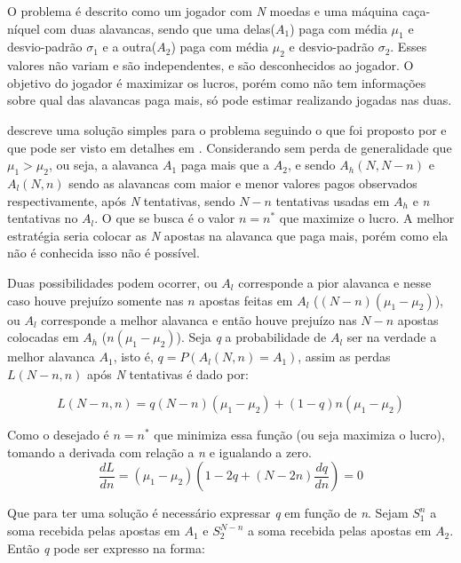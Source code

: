 O problema é descrito como um jogador com \textit{N} moedas e uma máquina caça-níquel com duas alavancas, sendo que uma delas(\(A_1\)) paga com média \(\mu_1\) e desvio-padrão \(\sigma_1\) e a outra(\(A_2\)) paga com média \(\mu_2\) e desvio-padrão \(\sigma_2\). Esses valores não variam e são independentes, e são desconhecidos ao jogador. O objetivo do jogador é maximizar os lucros, porém como não tem informações sobre qual das alavancas paga mais, só pode estimar realizando jogadas nas duas. 

\citeauthor{Mitchell1996} descreve uma solução simples para o problema seguindo o que foi proposto por \citeauthor{Holland1992} e que pode ser visto em detalhes em . Considerando sem perda de generalidade que \(\mu_1 > \mu_2\), ou seja, a alavanca \(A_1\) paga mais que a \(A_2\), e sendo \(A_h(N, N-n)\) e \(A_l(N,n)\) sendo as alavancas com maior e menor valores pagos observados respectivamente, após \textit{N} tentativas, sendo \(N-n\) tentativas usadas em \(A_h\) e \textit{n} tentativas no \(A_l\). O que se busca é o valor \(n = n^*\) que maximize o lucro. A melhor estratégia seria colocar as \textit{N} apostas na alavanca que paga mais, porém como ela não é conhecida isso não é possível.

Duas possibilidades podem ocorrer, ou \(A_l\) corresponde a pior alavanca e nesse caso houve prejuízo somente nas \(n\) apostas feitas em \(A_l\) (\((N-n)(\mu_1-\mu_2)\)), ou \(A_l\) corresponde a melhor alavanca e então houve prejuízo nas \(N- n\) apostas colocadas em \(A_h\) (\(n(\mu_1-\mu_2)\)). Seja \textit{q} a probabilidade de \(A_l\) ser na verdade a melhor alavanca \(A_1\), isto é, \(q = P(A_l(N,n) = A_1)\), assim as perdas \(L(N-n,n)\) após \textit{N} tentativas é dado por:

\begin{equation*}
L(N-n,n) = q(N-n)(\mu_1-\mu_2) + (1-q)n(\mu_1-\mu_2)
\end{equation*}

Como o desejado é \(n = n^*\) que minimiza essa função (ou seja maximiza o lucro), tomando a derivada com relação a \textit{n} e igualando a zero.
\begin{equation*}
\frac{dL}{dn} = (\mu_1-\mu_2)\left( 1 - 2q + (N-2n)\frac{dq}{dn}\right) = 0
\end{equation*}

Que para ter uma solução é necessário expressar \textit{q} em função de \textit{n}. Sejam \(S_1^n\) a soma recebida pelas apostas em \(A_1\) e \(S_2^{N-n}\) a soma recebida pelas apostas em \(A_2\). Então \textit{q} pode ser expresso na forma:

